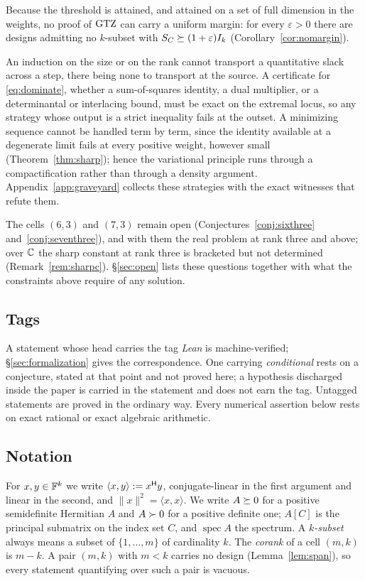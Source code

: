 \medskip

Because the threshold is attained, and attained on a set of full dimension
in the weights, no proof of $\mathrm{GTZ}$ can carry a uniform margin: for every
$\varepsilon>0$ there are designs admitting no $k$-subset with
$S_{C}\succeq(1+\varepsilon)I_k$ (Corollary~\ref{cor:nomargin}).

An induction on the size or on the rank cannot transport a quantitative
slack across a step, there being none to transport at the source.  A
certificate for \eqref{eq:dominate}, whether a sum-of-squares identity, a
dual multiplier, or a determinantal or interlacing bound, must be exact
on the extremal locus, so any strategy whose output is a strict
inequality fails at the outset.  A minimizing
sequence cannot be handled term by term, since the identity available at a
degenerate limit fails at every positive weight, however small
(Theorem~\ref{thm:sharp}); hence the variational principle runs through a
compactification rather than through a density argument.
Appendix~\ref{app:graveyard} collects these strategies with the exact
witnesses that refute them.

The cells $(6,3)$ and $(7,3)$ remain open
(Conjectures~\ref{conj:sixthree} and~\ref{conj:seventhree}), and with them
the real problem at rank three and above; over $\mathbb{C}$ the sharp constant at
rank three is bracketed but not determined (Remark~\ref{rem:sharpc}).
\S\ref{sec:open} lists these questions together with what the constraints
above require of any solution.

\subsection*{Tags}

A statement whose head carries the tag \emph{Lean} is machine-verified;
\S\ref{sec:formalization} gives the correspondence.  One carrying
\emph{conditional} rests on a conjecture, stated at that point and not
proved here; a hypothesis discharged inside the paper is carried in the
statement and does not earn the tag.  Untagged statements are proved in
the ordinary way.  Every numerical assertion below rests on exact
rational or exact algebraic arithmetic.

\subsection*{Notation}

For $x,y\in\mathbb{F}^k$ we write $\langle x,y\rangle:=x^{\mathsf{H}} y$, conjugate-linear
in the first argument and linear in the second, and
$\lVert x\rVert^2=\langle x,x\rangle$.  We write $A\succeq0$ for a positive
semidefinite Hermitian $A$ and $A\succ0$ for a positive definite one;
$A[C]$ is the principal submatrix on the index set $C$, and
$\operatorname{spec}A$ the spectrum.  A \emph{$k$-subset} always means a
subset of $\{1,\dots,m\}$ of cardinality $k$.  The \emph{corank} of a cell
$(m,k)$ is $m-k$.  A pair $(m,k)$ with $m<k$ carries no design
(Lemma~\ref{lem:span}), so every statement quantifying over such a pair is
vacuous.

